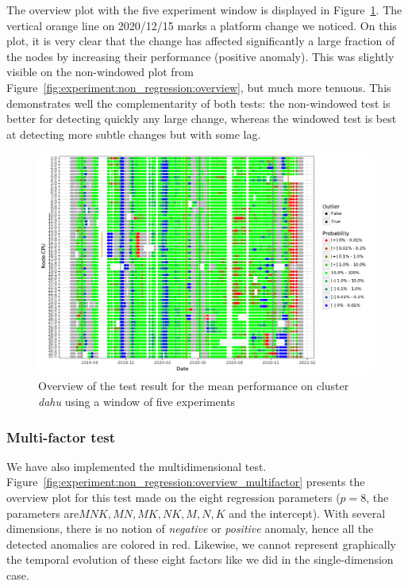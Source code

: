                 The overview plot with the five experiment window is displayed in
                Figure~\ref{fig:experiment:non_regression:overview_windowed}. The vertical orange line on 2020/12/15
                marks a platform change we noticed. On this plot, it is very clear that the change has affected
                significantly a large fraction of the nodes by increasing their performance (positive anomaly). This was
                slightly visible on the non-windowed plot from Figure~\ref{fig:experiment:non_regression:overview}, but
                much more tenuous. This demonstrates well the complementarity of both tests: the non-windowed test is
                better for detecting quickly any large change, whereas the windowed test is best at detecting more
                subtle changes but with some lag.

                \begin{figure}[htpb]
                    \centering
                    \includegraphics[width=\linewidth]{img/experiment/non_regression/implementation/overview_windowed.pdf}
                    \caption{Overview of the test result for the mean performance on cluster \emph{dahu} using a window
                    of five experiments}%
                    \label{fig:experiment:non_regression:overview_windowed}
                \end{figure}

            \subsubsection{Multi-factor test}%

                We have also implemented the multidimensional test.
                Figure~\ref{fig:experiment:non_regression:overview_multifactor} presents the overview plot for this test
                made on the eight regression parameters (\ie \(p=8\), the parameters are\(MNK, MN, MK, NK, M, N, K\) and
                the intercept). With several dimensions, there is no notion of \emph{negative} or \emph{positive}
                anomaly, hence all the detected anomalies are colored in red. Likewise, we cannot represent graphically
                the temporal evolution of these eight factors like we did in the single-dimension case.

